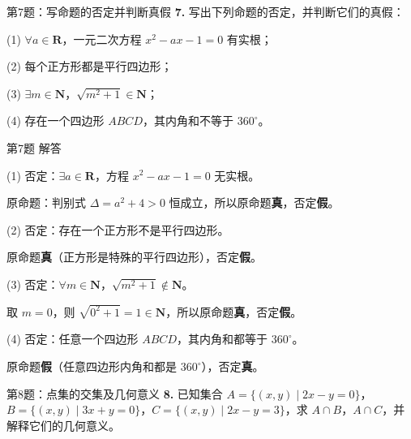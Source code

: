 \documentclass[10pt,aspectratio=169,serif]{beamer}
\begin{document}
\begin{frame}[t]{第7题：写命题的否定并判断真假}
\textbf{7.} 写出下列命题的否定，并判断它们的真假：

\vspace{0.5em}
(1) $\forall a \in \mathbf{R}$，一元二次方程 $x^2 - ax - 1 = 0$ 有实根；

\vspace{0.3em}
(2) 每个正方形都是平行四边形；

\vspace{0.3em}
(3) $\exists m \in \mathbf{N}$，$\sqrt{m^2 + 1} \in \mathbf{N}$；

\vspace{0.3em}
(4) 存在一个四边形 $ABCD$，其内角和不等于 $360^\circ$。
\end{frame}

\begin{frame}[t]{第7题 解答}
\begin{tcolorbox}[colback=orange!10,colframe=orange,title=\textbf{解}]
(1) 否定：$\exists a \in \mathbf{R}$，方程 $x^2 - ax - 1 = 0$ 无实根。

\vspace{0.3em}
原命题：判别式 $\Delta = a^2 + 4 > 0$ 恒成立，所以原命题\textbf{真}，否定\textbf{假}。

\vspace{0.6em}
(2) 否定：存在一个正方形不是平行四边形。

\vspace{0.3em}
原命题\textbf{真}（正方形是特殊的平行四边形），否定\textbf{假}。

\vspace{0.6em}
(3) 否定：$\forall m \in \mathbf{N}$，$\sqrt{m^2 + 1} \notin \mathbf{N}$。

\vspace{0.3em}
取 $m = 0$，则 $\sqrt{0^2 + 1} = 1 \in \mathbf{N}$，所以原命题\textbf{真}，否定\textbf{假}。

\vspace{0.6em}
(4) 否定：任意一个四边形 $ABCD$，其内角和都等于 $360^\circ$。

\vspace{0.3em}
原命题\textbf{假}（任意四边形内角和都是 $360^\circ$），否定\textbf{真}。
\end{tcolorbox}
\end{frame}

\begin{frame}[t]{第8题：点集的交集及几何意义}
\textbf{8.} 已知集合 $A = \{(x, y) \mid 2x - y = 0\}$，$B = \{(x, y) \mid 3x + y = 0\}$，$C = \{(x, y) \mid 2x - y = 3\}$，求 $A \cap B$，$A \cap C$，并解释它们的几何意义。
\end{frame}
\end{document}
